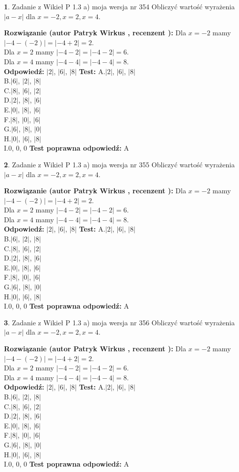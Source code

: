 \documentclass[12pt, a4paper]{article}
\theoremstyle{definition} %
\newtheorem{zad}{}
\newcommand{\zadStart}[1]{\begin{zad}#1\newline}
\newcommand{\zadStop}{\end{zad}}
\newcommand{\rozwStart}[2]{\noindent \textbf{Rozwiązanie (autor #1 , recenzent #2): }\newline}
\newcommand{\rozwStop}{\newline}
\newcommand{\odpStart}{\noindent \textbf{Odpowiedź:}\newline}
\newcommand{\odpStop}{\newline}
\newcommand{\testStart}{\noindent \textbf{Test:}\newline}
\newcommand{\testStop}{\newline}
\newcommand{\kluczStart}{\noindent \textbf{Test poprawna odpowiedź:}\newline}
\newcommand{\kluczStop}{\newline}
\begin{document}
\zadStart{Zadanie z Wikieł P 1.3 a) moja wersja nr 354}
Obliczyć wartość wyrażenia $|a - x|$ dla $x=-2,x=2,x=4$.
\zadStop
\rozwStart{Patryk Wirkus}{}
Dla $x = -2$ mamy $|-4 - (-2)| = |-4 + 2| = 2$.\\
Dla $x = 2$ mamy $|-4 - 2| = |-4 - 2| = 6$.\\
Dla $x = 4$ mamy $|-4 - 4| = |-4 - 4| = 8$.\\
\rozwStop
\odpStart
$|2|$, $|6|$, $|8|$
\odpStop
\testStart
A.$|2|$, $|6|$, $|8|$\\
B.$|6|$, $|2|$, $|8|$\\
C.$|8|$, $|6|$, $|2|$\\
D.$|2|$, $|8|$, $|6|$\\
E.$|0|$, $|8|$, $|6|$\\
F.$|8|$, $|0|$, $|6|$\\
G.$|6|$, $|8|$, $|0|$\\
H.$|0|$, $|6|$, $|8|$\\
I.$0$, $0$, $0$
\testStop
\kluczStart
A
\kluczStop



\zadStart{Zadanie z Wikieł P 1.3 a) moja wersja nr 355}
Obliczyć wartość wyrażenia $|a - x|$ dla $x=-2,x=2,x=4$.
\zadStop
\rozwStart{Patryk Wirkus}{}
Dla $x = -2$ mamy $|-4 - (-2)| = |-4 + 2| = 2$.\\
Dla $x = 2$ mamy $|-4 - 2| = |-4 - 2| = 6$.\\
Dla $x = 4$ mamy $|-4 - 4| = |-4 - 4| = 8$.\\
\rozwStop
\odpStart
$|2|$, $|6|$, $|8|$
\odpStop
\testStart
A.$|2|$, $|6|$, $|8|$\\
B.$|6|$, $|2|$, $|8|$\\
C.$|8|$, $|6|$, $|2|$\\
D.$|2|$, $|8|$, $|6|$\\
E.$|0|$, $|8|$, $|6|$\\
F.$|8|$, $|0|$, $|6|$\\
G.$|6|$, $|8|$, $|0|$\\
H.$|0|$, $|6|$, $|8|$\\
I.$0$, $0$, $0$
\testStop
\kluczStart
A
\kluczStop



\zadStart{Zadanie z Wikieł P 1.3 a) moja wersja nr 356}
Obliczyć wartość wyrażenia $|a - x|$ dla $x=-2,x=2,x=4$.
\zadStop
\rozwStart{Patryk Wirkus}{}
Dla $x = -2$ mamy $|-4 - (-2)| = |-4 + 2| = 2$.\\
Dla $x = 2$ mamy $|-4 - 2| = |-4 - 2| = 6$.\\
Dla $x = 4$ mamy $|-4 - 4| = |-4 - 4| = 8$.\\
\rozwStop
\odpStart
$|2|$, $|6|$, $|8|$
\odpStop
\testStart
A.$|2|$, $|6|$, $|8|$\\
B.$|6|$, $|2|$, $|8|$\\
C.$|8|$, $|6|$, $|2|$\\
D.$|2|$, $|8|$, $|6|$\\
E.$|0|$, $|8|$, $|6|$\\
F.$|8|$, $|0|$, $|6|$\\
G.$|6|$, $|8|$, $|0|$\\
H.$|0|$, $|6|$, $|8|$\\
I.$0$, $0$, $0$
\testStop
\kluczStart
A
\kluczStop
\end{document}
